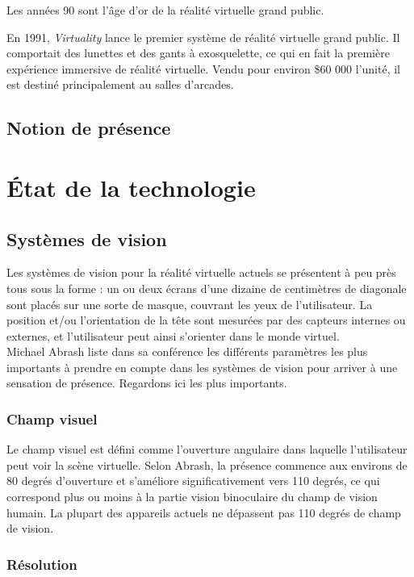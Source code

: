 \documentclass[a4,12pt]{scrartcl}
\begin{document}
Les années 90 sont l'âge d'or de la réalité virtuelle grand public.


En 1991, \emph{Virtuality} lance le premier système de réalité virtuelle grand public. Il comportait des lunettes et des gants à exosquelette, ce qui en fait la première expérience immersive de réalité virtuelle. Vendu pour environ \$60 000 l'unité, il est destiné principalement au salles d'arcades.

\subsection{Notion de présence}


\section{État de la technologie}


\subsection{Systèmes de vision}

Les systèmes de vision pour la réalité virtuelle actuels se présentent à peu près tous sous la forme : un ou deux écrans d’une dizaine de centimètres de diagonale sont placés sur une sorte de masque, couvrant les yeux de l’utilisateur. La position et/ou l’orientation de la tête sont mesurées par des capteurs internes ou externes, et l’utilisateur peut ainsi s’orienter dans le monde virtuel.\\

Michael Abrash liste dans sa conférence \cite{Abrash14} les différents paramètres les plus importants à prendre en compte dans les systèmes de vision pour arriver à une sensation de présence. Regardons ici les plus importants.

\subsubsection{Champ visuel}

Le champ visuel est défini comme l'ouverture angulaire dans laquelle l'utilisateur peut voir la scène virtuelle. Selon Abrash, la présence commence aux environs de 80 degrés d'ouverture et s'améliore significativement vers 110 degrés, ce qui correspond plus ou moins à la partie vision binoculaire du champ de vision humain. La plupart des appareils actuels ne dépassent pas 110 degrés de champ de vision.

\subsubsection{Résolution}
\end{document}
